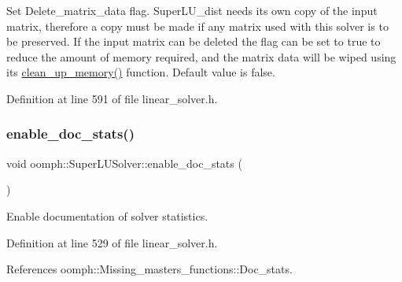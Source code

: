 Set Delete\+\_\+matrix\+\_\+data flag. Super\+L\+U\+\_\+dist needs its own copy of the input matrix, therefore a copy must be made if any matrix used with this solver is to be preserved. If the input matrix can be deleted the flag can be set to true to reduce the amount of memory required, and the matrix data will be wiped using its \hyperlink{classoomph_1_1SuperLUSolver_aec78b96a8f831a89f9b8fb48b1ce0c68}{clean\+\_\+up\+\_\+memory()} function. Default value is false. 



Definition at line 591 of file linear\+\_\+solver.\+h.

\mbox{\label{classoomph_1_1SuperLUSolver_a3eca8399eb777ea97eaad15383eb5795}} 
\subsubsection{\texorpdfstring{enable\+\_\+doc\+\_\+stats()}{enable\_doc\_stats()}}
{\footnotesize\ttfamily void oomph\+::\+Super\+L\+U\+Solver\+::enable\+\_\+doc\+\_\+stats (\begin{DoxyParamCaption}{ }\end{DoxyParamCaption})\hspace{0.3cm}{\ttfamily [inline]}}



Enable documentation of solver statistics. 



Definition at line 529 of file linear\+\_\+solver.\+h.



References oomph\+::\+Missing\+\_\+masters\+\_\+functions\+::\+Doc\+\_\+stats.

\mbox{\label{classoomph_1_1SuperLUSolver_a9489a249d736316901e1644e73aa55b9}} 
